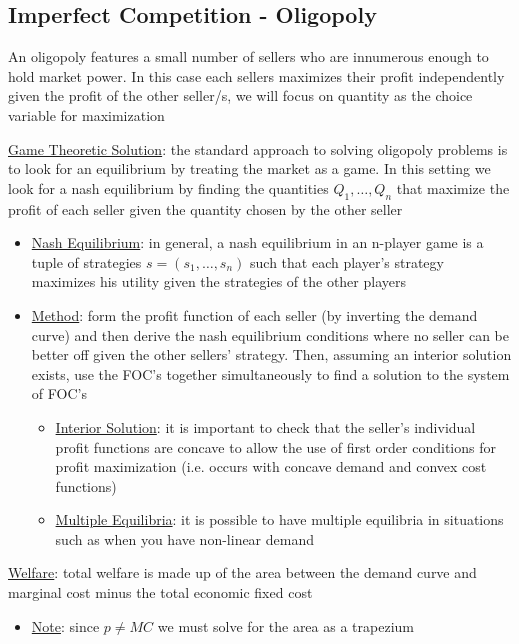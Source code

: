 \documentclass{article}
\begin{document}
\subsection{Imperfect Competition - Oligopoly}
An oligopoly features a small number of sellers who are innumerous enough to hold market power. In this case each sellers maximizes their profit independently given the profit of the other seller/s, we will focus on quantity as the choice variable for maximization \par \vspace{0.3em}
  \underline{Game Theoretic Solution}: the standard approach to solving oligopoly problems is to look for an equilibrium by treating the market as a game. In this setting we look for a nash equilibrium by finding the quantities $Q_{1}, \dots, Q_{n}$ that maximize the profit of each seller given the quantity chosen by the other seller
  \begin{itemize}
    \item  \underline{Nash Equilibrium}: in general, a nash equilibrium in an n-player game is a tuple of strategies $s = (s_{1}, \dots, s_{n})$ such that each player's strategy maximizes his utility given the strategies of the other players
    \item  \underline{Method}: form the profit function of each seller (by inverting the demand curve) and then derive the nash equilibrium conditions where no seller can be better off given the other sellers' strategy. Then, assuming an interior solution exists, use the FOC's together simultaneously to find a solution to the system of FOC's
    \begin{itemize}
      \item  \underline{Interior Solution}: it is important to check that the seller's individual profit functions are concave to allow the use of first order conditions for profit maximization (i.e. occurs with concave demand and convex cost functions)
      \item  \underline{Multiple Equilibria}: it is possible to have multiple equilibria in situations such as when you have non-linear demand
    \end{itemize}
  \end{itemize}
  \par
  \underline{Welfare}: total welfare is made up of the area between the demand curve and marginal cost minus the total economic fixed cost
  \begin{itemize}
    \item  \underline{Note}: since $p \neq MC$ we must solve for the area as a trapezium
  \end{itemize}
\end{document}
